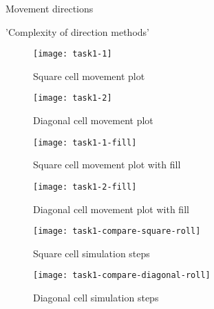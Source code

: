 









Movement directions

'Complexity of direction methods'

\clearpage

\begin{figure}[ht]
    \centering
    \texttt{[image: task1-1]}
    \caption[Square cell movement plot]{Square cell movement plot}
    \label{fig:task1-1}
\end{figure}

\begin{figure}[ht]
    \centering
    \texttt{[image: task1-2]}
    \caption[Diagonal cell movement plot]{Diagonal cell movement plot}
    \label{fig:task1-2}
\end{figure}

\begin{figure}[ht]
    \centering
    \texttt{[image: task1-1-fill]}
    \caption[Square cell movement plot with fill]{Square cell movement plot with fill}
    \label{fig:task1-1-fill}
\end{figure}

\begin{figure}[ht]
    \centering
    \texttt{[image: task1-2-fill]}
    \caption[Diagonal cell movement plot with fill]{Diagonal cell movement plot with fill}
    \label{fig:task1-2-fill}
\end{figure}

\clearpage

\begin{figure}[ht]
    \centering
    \texttt{[image: task1-compare-square-roll]}
    \caption[Square cell simulation steps]{Square cell simulation steps}
    \label{fig:task1-compare-square-roll}
\end{figure}

\begin{figure}[ht]
    \centering
    \texttt{[image: task1-compare-diagonal-roll]}
    \caption[Diagonal cell simulation steps]{Diagonal cell simulation steps}
    \label{fig:task1-compare-diagonal-roll}
\end{figure}

\clearpage

